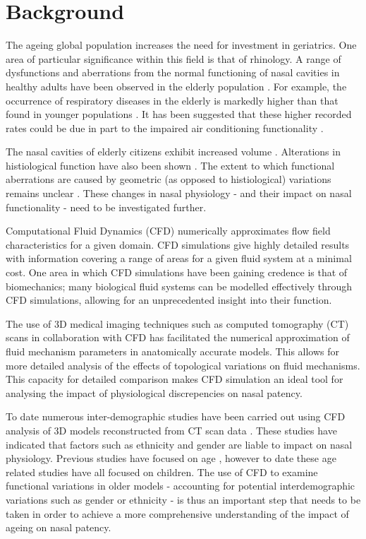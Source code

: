 \section{Background}

The ageing global population increases the need for investment in geriatrics. One area of particular significance within this field is that of rhinology. A range of dysfunctions and aberrations from the normal functioning of nasal cavities in healthy adults have been observed in the elderly population \cite{Edelstein1996, Lindemann2008}. For example, the occurrence of respiratory diseases in the elderly is markedly higher than that found in younger populations \cite{HO2001, Edelstein1996}. It has been suggested that these higher recorded rates could be due in part to the impaired air conditioning functionality \cite{Lindemann2008}.


The nasal cavities of elderly citizens exhibit increased volume \cite{Kalmovich2005}. Alterations in histiological function have also been shown \cite{HO2001}. The extent to which functional aberrations are caused by geometric (as opposed to histiological) variations remains unclear \cite{Varga-Huettner2013}. These changes in nasal physiology - and their impact on nasal functionality - need to be investigated further.


Computational Fluid Dynamics (CFD) numerically approximates flow field characteristics for a given domain. CFD simulations give highly detailed results with information covering a range of areas for a given fluid system at a minimal cost. One area in which CFD simulations have been gaining credence is that of biomechanics; many biological fluid systems can be modelled effectively through CFD simulations, allowing for an unprecedented insight into their function.

The use of 3D medical imaging techniques such as computed tomography (CT) scans in collaboration with CFD has facilitated the numerical approximation of fluid mechanism parameters in anatomically accurate models. This allows for more detailed analysis of the effects of topological variations on fluid mechanisms. This capacity for detailed comparison makes CFD simulation an ideal tool for analysing the impact of physiological discrepencies on nasal patency.


To date numerous inter-demographic studies have been carried out using CFD analysis of 3D models reconstructed from CT scan data \cite{Xi2012, Garcia2007, Zhu2011}. These studies have indicated that factors such as ethnicity and gender are liable to impact on nasal physiology. Previous studies have focused on age \cite{Xi2012}, however to date these age related studies have all focused on children. The use of CFD to examine functional variations in older models - accounting for potential interdemographic variations such as gender or ethnicity - is thus an important step that needs to be taken in order to achieve a more comprehensive understanding of the impact of ageing on nasal patency.


